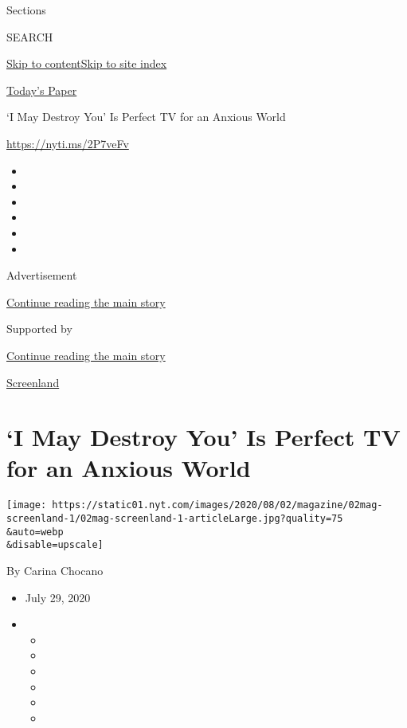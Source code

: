 Sections

SEARCH

\protect\hyperlink{site-content}{Skip to
content}\protect\hyperlink{site-index}{Skip to site index}

\href{https://myaccount.nytimes.com/auth/login?response_type=cookie\&client_id=vi}{}

\href{https://www.nytimes.com/section/todayspaper}{Today's Paper}

`I May Destroy You' Is Perfect TV for an Anxious World

\url{https://nyti.ms/2P7veFv}

\begin{itemize}
\item
\item
\item
\item
\item
\item
\end{itemize}

Advertisement

\protect\hyperlink{after-top}{Continue reading the main story}

Supported by

\protect\hyperlink{after-sponsor}{Continue reading the main story}

\href{/column/screenland}{Screenland}

\hypertarget{i-may-destroy-you-is-perfect-tv-for-an-anxious-world}{%
\section{`I May Destroy You' Is Perfect TV for an Anxious
World}\label{i-may-destroy-you-is-perfect-tv-for-an-anxious-world}}

\texttt{[image: https://static01.nyt.com/images/2020/08/02/magazine/02mag-screenland-1/02mag-screenland-1-articleLarge.jpg?quality=75\\\&auto=webp\\\&disable=upscale]}

By Carina Chocano

\begin{itemize}
\item
  July 29, 2020
\item
  \begin{itemize}
  \item
  \item
  \item
  \item
  \item
  \item
  \end{itemize}
\end{itemize}

